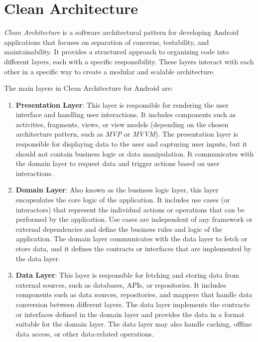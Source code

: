 \documentclass[a4paper, 12pt]{article}
\begin{document}
\section{Clean Architecture}

\textit{Clean Architecture} is a software architectural pattern for developing Android applications that focuses on separation of concerns, testability, and maintainability. 
It provides a structured approach to organizing code into different layers, each with a specific responsibility. 
These layers interact with each other in a specific way to create a modular and scalable architecture.

The main layers in Clean Architecture for Android are:

\begin{enumerate}
    \item \textbf{Presentation Layer}: This layer is responsible for rendering the user interface and handling user interactions. 
    It includes components such as activities, fragments, views, or view models (depending on the chosen architecture pattern, such as \textit{MVP} or \textit{MVVM}). 
    The presentation layer is responsible for displaying data to the user and capturing user inputs, but it should not contain business logic or data manipulation.
     It communicates with the domain layer to request data and trigger actions based on user interactions.

    \item \textbf{Domain Layer}: Also known as the business logic layer, this layer encapsulates the core logic of the application. 
    It includes use cases (or interactors) that represent the individual actions or operations that can be performed by the application. 
    Use cases are independent of any framework or external dependencies and define the business rules and logic of the application. 
    The domain layer communicates with the data layer to fetch or store data, and it defines the contracts or interfaces that are implemented by the data layer.
    
    \item \textbf{Data Layer}: This layer is responsible for fetching and storing data from external sources, such as databases, APIs, or repositories.
     It includes components such as data sources, repositories, and mappers that handle data conversion between different layers. 
     The data layer implements the contracts or interfaces defined in the domain layer and provides the data in a format suitable for the domain layer. 
     The data layer may also handle caching, offline data access, or other data-related operations.
    
\end{enumerate}
\end{document}
